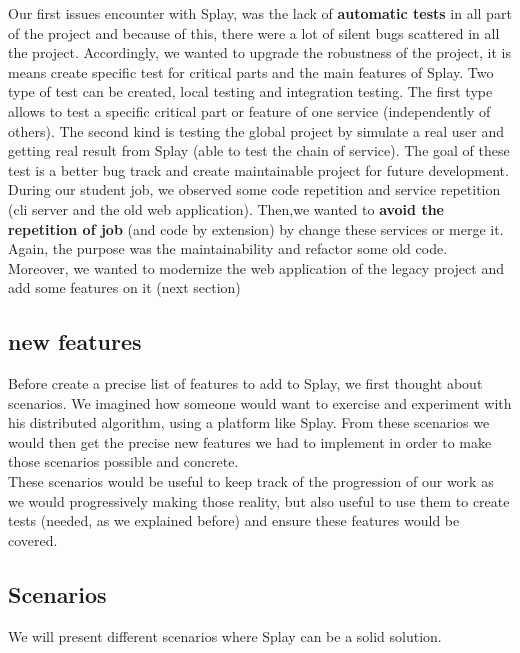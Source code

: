 \documentclass{eplmastersthesis}
\begin{document}
      Our first issues encounter with Splay, was the lack of
      \textbf{automatic tests} in all part of the project and because of this,
      there were a lot of silent bugs scattered in all the project.
      Accordingly, we wanted to upgrade the robustness of the project,
      it is means create specific test for critical parts and the main features
      of Splay. Two type of test can be created, local testing and integration
      testing. The first type allows to test a specific critical part or
      feature of one service (independently of others). The second kind is
      testing the global project by simulate a real user and getting real
      result from Splay (able to test the chain of service). The goal of these
      test is a better bug track and create maintainable project for future
      development.\\

      During our student job, we observed some code repetition and service
      repetition (cli server and the old web application). Then,we wanted
      to \textbf{avoid the repetition of job} (and code by extension) by
      change these services or merge it. Again, the purpose was the
      maintainability and refactor some old code. Moreover, we wanted to
      modernize the web application of the legacy project and add some
      features on it (next section)

\subsection{new features}
    Before create a precise list of features to add to Splay, we first
    thought about scenarios. We imagined how someone would want to exercise
    and experiment with his distributed algorithm, using a platform like
    Splay. From these scenarios we would then get the precise new features
    we had to implement in order to make those scenarios possible and
    concrete.\\

    These scenarios would be useful to keep track of the progression of our
    work as we would progressively making those reality, but also useful
    to use them to create tests (needed, as we explained before) and ensure
    these features would be covered.
    \subsection{Scenarios} %
      We will present different scenarios where Splay can be a solid solution.
\end{document}
